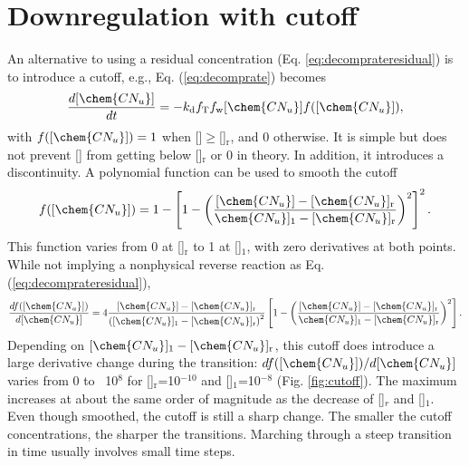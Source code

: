 \documentclass[gmd, manuscript]{copernicus}
\begin{document}
\section{Downregulation with cutoff}
\label{sec:cutoff}
An alternative to using a residual concentration (Eq. \ref{eq:decomprateresidual}) is to
introduce a cutoff, e.g., Eq. (\ref{eq:decomprate}) becomes
\begin{equation}
\frac{d [\chem{CN_u}]}{d t} = -k_\text{d} f_\text{T} f_\text{w}
[\chem{CN_u}] f([\chem{CN_u}]),
\end{equation}
with $f([\chem{CN_u}]) = 1$ when []$\geq$[]$_\text{r}$,
and 0 otherwise. It is simple but does not prevent [] from getting
below []$_\text{r}$ or 0 in theory. In addition, it introduces a
discontinuity. A polynomial function can be used to smooth the cutoff 
\begin{equation}
f([\chem{CN_u} ])=1-\left[1-\left(\frac{[\chem{CN_u}]-[\chem{CN_u}
]_\text{r}}{\chem{CN_u} ]_1-[\chem{CN_u} ]_\text{r}}\right)^2 \right]^2.
\label{eq:polycutoff}
\end{equation}
This function varies from 0 at []$_\text{r}$ to 1 at
[]$_1$, with zero derivatives at both points. While not implying a
nonphysical reverse reaction as Eq. (\ref{eq:decomprateresidual}), 
\begin{equation}
\frac{d f([\chem{CN_u} ])}{d[\chem{CN_u}]}=4 \frac{[\chem{CN_u}] -
[\chem{CN_u}]_\text{r}}{\left([\chem{CN_u}]_1 - [\chem{CN_u}]_\text{r} \right)^2}
\left[1-\left(\frac{[\chem{CN_u}]-[\chem{CN_u} ]_\text{r}}{\chem{CN_u}
]_1-[\chem{CN_u} ]_\text{r}}\right)^2 \right].
\label{eq:polycutoffderiv}
\end{equation}
Depending on $[\chem{CN_u}]_1-[\chem{CN_u}]_\text{r}$, this cutoff does
introduce a large derivative change during the transition:
$df([\chem{CN_u}])/d[\chem{CN_u}]$ varies from 0 to ~10$^8$ for
[]$_\text{r}$=10$^{-10}$  and []$_1$=10$^{-8}$ (Fig.
\ref{fig:cutoff}). The maximum increases at about the same order of magnitude
as the decrease of []$_r$ and []$_1$. Even though
smoothed, the cutoff is still a sharp change. The smaller the cutoff
concentrations, the sharper the transitions. Marching through a steep
transition in time usually involves small time steps.
\end{document}
